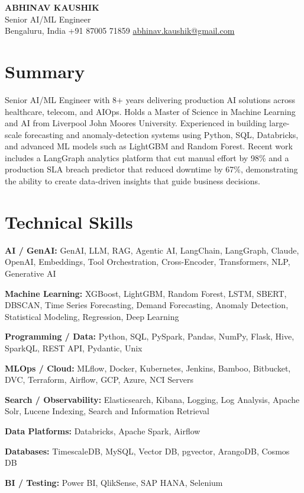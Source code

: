 \documentclass[10pt,a4paper]{article}
\begin{document}
\begin{center}
  {\LARGE\bfseries ABHINAV KAUSHIK}\\[2pt]
  {\large Senior AI/ML Engineer}\\[2pt]
  Bengaluru, India \textbar{} +91 87005 71859 \textbar{} \href{mailto:abhinav.kaushik@gmail.com}{abhinav.kaushik@gmail.com}
\end{center}

\section{Summary}
Senior AI/ML Engineer with 8+ years delivering production AI solutions across healthcare, telecom, and AIOps. Holds a Master of Science in Machine Learning and AI from Liverpool John Moores University. Experienced in building large-scale forecasting and anomaly-detection systems using Python, SQL, Databricks, and advanced ML models such as LightGBM and Random Forest. Recent work includes a LangGraph analytics platform that cut manual effort by 98\% and a production SLA breach predictor that reduced downtime by 67\%, demonstrating the ability to create data-driven insights that guide business decisions.

\section{Technical Skills}
\textbf{AI / GenAI:} GenAI, LLM, RAG, Agentic AI, LangChain, LangGraph, Claude, OpenAI, Embeddings, Tool Orchestration, Cross-Encoder, Transformers, NLP, Generative AI\par
\textbf{Machine Learning:} XGBoost, LightGBM, Random Forest, LSTM, SBERT, DBSCAN, Time Series Forecasting, Demand Forecasting, Anomaly Detection, Statistical Modeling, Regression, Deep Learning\par
\textbf{Programming / Data:} Python, SQL, PySpark, Pandas, NumPy, Flask, Hive, SparkQL, REST API, Pydantic, Unix\par
\textbf{MLOps / Cloud:} MLflow, Docker, Kubernetes, Jenkins, Bamboo, Bitbucket, DVC, Terraform, Airflow, GCP, Azure, NCI Servers\par
\textbf{Search / Observability:} Elasticsearch, Kibana, Logging, Log Analysis, Apache Solr, Lucene Indexing, Search and Information Retrieval\par
\textbf{Data Platforms:} Databricks, Apache Spark, Airflow\par
\textbf{Databases:} TimescaleDB, MySQL, Vector DB, pgvector, ArangoDB, Cosmos DB\par
\textbf{BI / Testing:} Power BI, QlikSense, SAP HANA, Selenium\par
\end{document}
